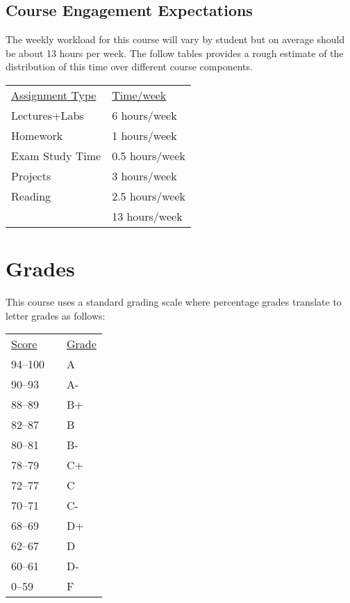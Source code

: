 \documentclass[10pt]{article}
\begin{document}
\subsection{Course Engagement Expectations}

The weekly workload for this course will vary by student but on average should be about 13 hours per week.  The follow tables provides a rough estimate of the distribution of this time over different course components.
\begin{center}
\begin{tabular}{ll}
\underline{Assignment Type} & \underline{Time/week} \\
Lectures+Labs       & 6 hours/week \\
Homework          & 1 hours/week \\
Exam Study Time    & 0.5 hours/week \\
Projects          & 3 hours/week \\
Reading &  2.5 hours/week \\
\bottomrule
 & 13 hours/week
\end{tabular}
\end{center}

\section{Grades}

This course uses a standard grading scale where percentage grades translate to letter grades as follows:

\begin{center}
\begin{small}
\begin{tabular}{lcl}
\underline{Score} & & \underline{Grade} \\
94--100 & & A \\
90--93 & & A- \\
88--89 & & B+ \\
82--87 & & B \\
80--81 & & B- \\
78--79 & & C+ \\
72--77 & & C \\
70--71 & & C- \\
68--69 & & D+ \\
62--67 & & D \\
60--61 & & D- \\
0--59 & & F
\end{tabular}
\end{small}
\end{center}
\end{document}
